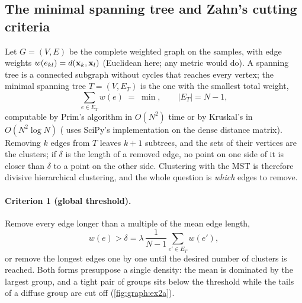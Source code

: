 \subsection{The minimal spanning tree and Zahn's cutting criteria}\label{sec:graph:mst}

Let $G=(V,E)$ be the complete weighted graph on the samples, with edge weights $w(e_{kl})=d(\mathbf{x}_k,\mathbf{x}_l)$ (Euclidean here; any metric would do). A spanning tree is a connected subgraph without cycles that reaches every vertex; the minimal spanning tree $T=(V,E_T)$ is the one with the smallest total weight,
\begin{equation}
  \sum_{e\in E_T} w(e)\;=\;\min,\qquad |E_T|=N-1,
  \label{eq:graph:mst}
\end{equation}
computable by Prim's algorithm in $O(N^2)$ time or by Kruskal's in $O(N^2\log N)$ \cite{prim:1957,kruskal:1956} ( uses SciPy's implementation on the dense distance matrix). Removing $k$ edges from $T$ leaves $k+1$ subtrees, and the sets of their vertices are the clusters; if $\delta$ is the length of a removed edge, no point on one side of it is closer than $\delta$ to a point on the other side. Clustering with the MST is therefore divisive hierarchical clustering, and the whole question is \emph{which} edges to remove.

\paragraph{Criterion 1 (global threshold).} Remove every edge longer than a multiple of the mean edge length,
\begin{equation}
  w(e)>\delta=\lambda\,\frac{1}{N-1}\sum_{e'\in E_T}w(e'),
  \label{eq:graph:crit1}
\end{equation}
or remove the longest edges one by one until the desired number of clusters is reached. Both forms presuppose a single density: the mean is dominated by the largest group, and a tight pair of groups sits below the threshold while the tails of a diffuse group are cut off (\cref{fig:graph:ex2a}).

